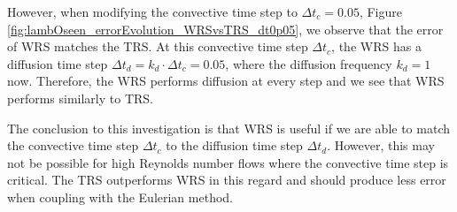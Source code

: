 However, when modifying the convective time step to $\Delta t_c=0.05$, Figure \ref{fig:lambOseen_errorEvolution_WRSvsTRS_dt0p05}, we observe that the error of WRS matches the TRS. At this convective time step $\Delta t_c$, the WRS has a diffusion time step $\Delta t_d = k_d \cdot \Delta t_c = 0.05$, where the diffusion frequency $k_d = 1$ now. Therefore, the WRS performs diffusion at every step and we see that WRS performs similarly to TRS.

The conclusion to this investigation is that WRS is useful if we are able to match the convective time step $\Delta t_c$ to the diffusion time step $\Delta t_d$. However, this may not be possible for high Reynolds number flows where the convective time step is critical. The TRS outperforms WRS in this regard and should produce less error when coupling with the Eulerian method.

%

	
  


